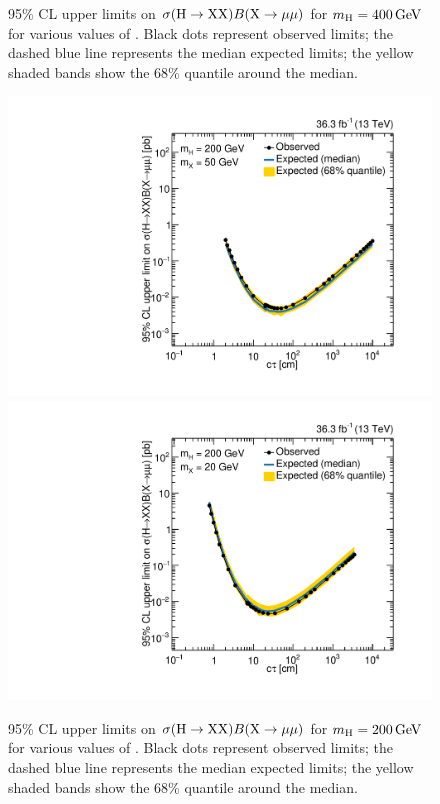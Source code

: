 \begin{figure}[htbp]
  \caption[95\% CL upper limits on $\sigma(\PHiggs\to \PLLP\PLLP)B(\PLLP\to\Pgm\Pgm)$ for $\mH = 400\GeV$ for various values of \mX.]{95\% CL upper limits on $\sigma(\PHiggs\to \PLLP\PLLP)B(\PLLP\to\Pgm\Pgm)$ for $\mH = 400\GeV$ for various values of \mX. Black dots represent observed limits; the dashed blue line represents the median expected limits; the yellow shaded bands show the 68\% quantile around the median.}
  \label{fig:dd:UpperLimits_mH_400}
\end{figure}

\begin{figure}[htbp]
  \centering
  \includegraphics[width=\DSquareWidth]{figures/displaced/Limits_2Mu_200_50_HybridNew.pdf}
  \hspace*{-2em}
  \includegraphics[width=\DSquareWidth]{figures/displaced/Limits_2Mu_200_20_HybridNew.pdf}
  \caption[95\% CL upper limits on $\sigma(\PHiggs\to \PLLP\PLLP)B(\PLLP\to\Pgm\Pgm)$ for $\mH = 200\GeV$ for various values of \mX.]{95\% CL upper limits on $\sigma(\PHiggs\to \PLLP\PLLP)B(\PLLP\to\Pgm\Pgm)$ for $\mH = 200\GeV$ for various values of \mX. Black dots represent observed limits; the dashed blue line represents the median expected limits; the yellow shaded bands show the 68\% quantile around the median.}
  \label{fig:dd:UpperLimits_mH_200}
\end{figure}

